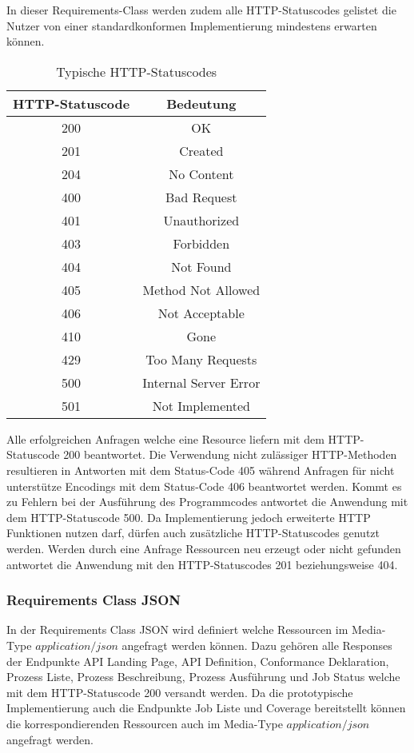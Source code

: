 In dieser Requirements-Class werden zudem alle HTTP-Statuscodes gelistet die Nutzer von einer standardkonformen Implementierung mindestens erwarten können. 
\begin{table}[H]
    \caption{Typische HTTP-Statuscodes \cite{ogc_api_processes_core}}
    \centering
    \begin{tabular}{c c} 
        HTTP-Statuscode & Bedeutung\\ 
        \hline
        200 & OK\\
        201 & Created\\
        204 & No Content\\
        400 & Bad Request\\
        401 & Unauthorized\\
        403 & Forbidden\\
        404 & Not Found\\
        405 & Method Not Allowed\\
        406 & Not Acceptable\\
        410 & Gone\\
        429 & Too Many Requests\\
        500 & Internal Server Error\\
        501 & Not Implemented\\
    \end{tabular}\label{httpcodes}
\end{table}
Alle erfolgreichen Anfragen welche eine Resource liefern mit dem HTTP-Statuscode 200 beantwortet. Die Verwendung nicht zulässiger HTTP-Methoden resultieren 
in Antworten mit dem Status-Code 405 während Anfragen für nicht unterstütze Encodings mit dem Status-Code 406 beantwortet werden. Kommt es zu Fehlern bei der Ausführung 
des Programmcodes antwortet die Anwendung mit dem HTTP-Statuscode 500. Da Implementierung jedoch erweiterte HTTP Funktionen nutzen darf, dürfen auch zusätzliche 
HTTP-Statuscodes genutzt werden. Werden durch eine Anfrage Ressourcen neu erzeugt oder nicht gefunden antwortet die Anwendung mit den HTTP-Statuscodes 201 beziehungsweise
404. 

\subsubsection{Requirements Class JSON}
In der Requirements Class JSON wird definiert welche Ressourcen im Media-Type $application/json$ angefragt werden können. Dazu gehören alle Responses der 
Endpunkte API Landing Page, API Definition, Conformance Deklaration, Prozess Liste, Prozess Beschreibung, Prozess Ausführung und Job Status welche mit dem 
HTTP-Statuscode 200 versandt werden. Da die prototypische Implementierung auch die Endpunkte Job Liste und Coverage bereitstellt können die korrespondierenden
Ressourcen auch im Media-Type $application/json$ angefragt werden.

